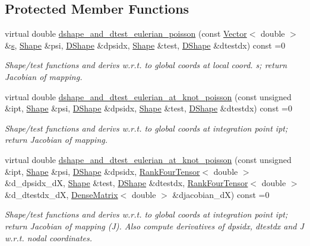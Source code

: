 \subsection*{Protected Member Functions}
\begin{DoxyCompactItemize}
\item 
virtual double \hyperlink{classoomph_1_1PoissonEquations_a88afb41d8733fb3488754cb579f44770}{dshape\+\_\+and\+\_\+dtest\+\_\+eulerian\+\_\+poisson} (const \hyperlink{classoomph_1_1Vector}{Vector}$<$ double $>$ \&\hyperlink{cfortran_8h_ab7123126e4885ef647dd9c6e3807a21c}{s}, \hyperlink{classoomph_1_1Shape}{Shape} \&psi, \hyperlink{classoomph_1_1DShape}{D\+Shape} \&dpsidx, \hyperlink{classoomph_1_1Shape}{Shape} \&test, \hyperlink{classoomph_1_1DShape}{D\+Shape} \&dtestdx) const =0
\begin{DoxyCompactList}\small\item\em Shape/test functions and derivs w.\+r.\+t. to global coords at local coord. s; return Jacobian of mapping. \end{DoxyCompactList}\item 
virtual double \hyperlink{classoomph_1_1PoissonEquations_af68ad067d9a9d1bcbcc1ee3094b77a7a}{dshape\+\_\+and\+\_\+dtest\+\_\+eulerian\+\_\+at\+\_\+knot\+\_\+poisson} (const unsigned \&ipt, \hyperlink{classoomph_1_1Shape}{Shape} \&psi, \hyperlink{classoomph_1_1DShape}{D\+Shape} \&dpsidx, \hyperlink{classoomph_1_1Shape}{Shape} \&test, \hyperlink{classoomph_1_1DShape}{D\+Shape} \&dtestdx) const =0
\begin{DoxyCompactList}\small\item\em Shape/test functions and derivs w.\+r.\+t. to global coords at integration point ipt; return Jacobian of mapping. \end{DoxyCompactList}\item 
virtual double \hyperlink{classoomph_1_1PoissonEquations_a09f816da9c9b23fd6a308601fe536cef}{dshape\+\_\+and\+\_\+dtest\+\_\+eulerian\+\_\+at\+\_\+knot\+\_\+poisson} (const unsigned \&ipt, \hyperlink{classoomph_1_1Shape}{Shape} \&psi, \hyperlink{classoomph_1_1DShape}{D\+Shape} \&dpsidx, \hyperlink{classoomph_1_1RankFourTensor}{Rank\+Four\+Tensor}$<$ double $>$ \&d\+\_\+dpsidx\+\_\+dX, \hyperlink{classoomph_1_1Shape}{Shape} \&test, \hyperlink{classoomph_1_1DShape}{D\+Shape} \&dtestdx, \hyperlink{classoomph_1_1RankFourTensor}{Rank\+Four\+Tensor}$<$ double $>$ \&d\+\_\+dtestdx\+\_\+dX, \hyperlink{classoomph_1_1DenseMatrix}{Dense\+Matrix}$<$ double $>$ \&djacobian\+\_\+dX) const =0
\begin{DoxyCompactList}\small\item\em Shape/test functions and derivs w.\+r.\+t. to global coords at integration point ipt; return Jacobian of mapping (J). Also compute derivatives of dpsidx, dtestdx and J w.\+r.\+t. nodal coordinates. \end{DoxyCompactList}\item 

\end{DoxyCompactItemize}
